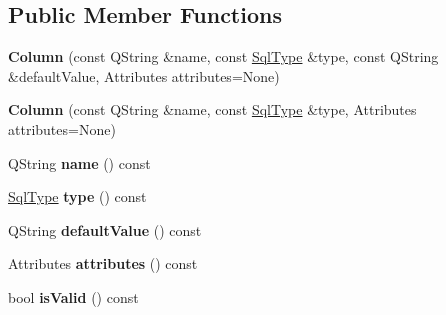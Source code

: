 \subsection*{Public Member Functions}
\begin{DoxyCompactItemize}
\item 
\mbox{\label{class_q_sql_migrator_1_1_structure_1_1_column_a786b3029fb5c1f4f1fca8caee11b9415}} 
{\bfseries Column} (const Q\+String \&name, const \hyperlink{class_q_sql_migrator_1_1_structure_1_1_sql_type}{Sql\+Type} \&type, const Q\+String \&default\+Value, Attributes attributes=None)
\item 
\mbox{\label{class_q_sql_migrator_1_1_structure_1_1_column_a802ff4eccf32980bd37d18d33549eb52}} 
{\bfseries Column} (const Q\+String \&name, const \hyperlink{class_q_sql_migrator_1_1_structure_1_1_sql_type}{Sql\+Type} \&type, Attributes attributes=None)
\item 
\mbox{\label{class_q_sql_migrator_1_1_structure_1_1_column_a44f84c048cc2d5b425a958866da74d13}} 
Q\+String {\bfseries name} () const
\item 
\mbox{\label{class_q_sql_migrator_1_1_structure_1_1_column_af099a84c30b804b4be38f294d1d9688c}} 
\hyperlink{class_q_sql_migrator_1_1_structure_1_1_sql_type}{Sql\+Type} {\bfseries type} () const
\item 
\mbox{\label{class_q_sql_migrator_1_1_structure_1_1_column_ab83cf3763120a3d583621751ce823886}} 
Q\+String {\bfseries default\+Value} () const
\item 
\mbox{\label{class_q_sql_migrator_1_1_structure_1_1_column_a6a14f38e0f35abd034404900427254d0}} 
Attributes {\bfseries attributes} () const
\item 
\mbox{\label{class_q_sql_migrator_1_1_structure_1_1_column_a85c519791d6256be439657d4b7066aa5}} 
bool {\bfseries is\+Valid} () const
\item 
\mbox{\label{class_q_sql_migrator_1_1_structure_1_1_column_a5a308d42ad4040cec7f2c23c18514fda}} 

\end{DoxyCompactItemize}
